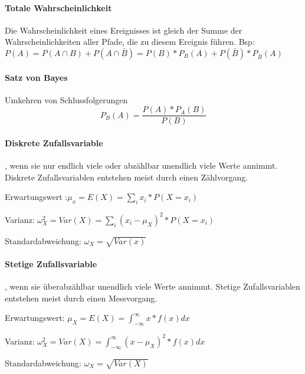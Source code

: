 \documentclass[a4paper]{article}
\begin{document}
\begin{multicols}{3}
  \paragraph{Totale Wahrscheinlichkeit}
  Die Wahrscheinlichkeit eines Ereignisses ist gleich der Summe der Wahrscheinlichkeiten aller Pfade, die zu diesem Ereignis führen.
  Bsp: $P(A) = P(A\cap B) + P(A\cap \bar{B}) = P(B)*P_B(A)+P(\bar{B})*P_{\bar{B}}(A)$

  \paragraph{Satz von Bayes} Umkehren von Schlussfolgerungen
  $$P_B(A)=\frac{P(A)*P_A(B)}{P(B)}$$

  \paragraph{Diskrete Zufallsvariable}
  , wenn sie nur endlich viele oder abzählbar unendlich viele Werte annimmt.
  Diskrete Zufallsvariablen entstehen meist durch einen Zählvorgang.

  \begin{itemize*}
    \item Erwartungswert :$\mu_x =E(X)=\sum_i x_i*P(X=x_i)$\\
    \item Varianz: $\omega^2_X = Var(X) = \sum_i(x_i-\mu_X)^2 *P(X=x_i)$\\
    \item Standardabweichung: $\omega_X = \sqrt{Var(x)}$
  \end{itemize*}

  \paragraph{Stetige Zufallsvariable}
  , wenn sie überabzählbar unendlich viele Werte annimmt.
  Stetige Zufallsvariablen entstehen meist durch einen Messvorgang.

  \begin{itemize*}
    \item Erwartungswert: $\mu_X= E(X)=\int_{-\infty}^{\infty} x*f(x)dx$\\
    \item Varianz: $\omega_X^2 =Var(X) = \int_{-\infty}^{\infty} (x-\mu_X)^2 *f(x)dx$\\
    \item Standardabweichung: $\omega_X= \sqrt{Var(X)}$
  \end{itemize*}


\end{multicols}
\end{document}
